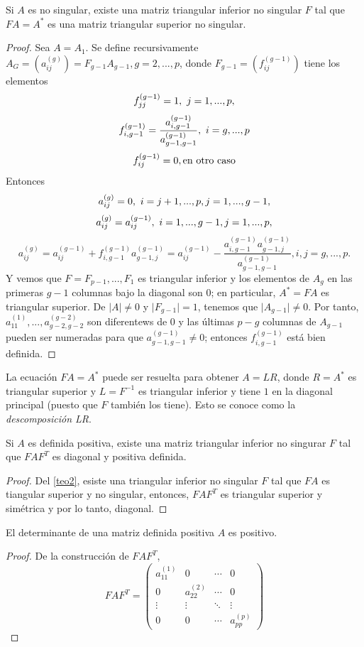 \begin{teorema}\label{teo2}
Si $A$ es no singular, existe una matriz triangular inferior no singular $F$ tal que $FA=A^*$ es una matriz triangular superior no singular.
\end{teorema}
\begin{proof}
Sea $A=A_1$. Se define recursivamente $A_G=(a_{ij}^{(g)})=F_{g-1}A_{g-1},g=2,...,p$, donde $F_{g-1}=(f_{ij}^{(g-1)})$ tiene los elementos
\[ f_{jj}^{(g-1)}=1,\textnormal{   } j=1,...,p, \]
\[ f_{i,g-1}^{(g-1)} = \frac{a_{i,g-1}^{(g-1)} }{a_{g-1,g-1}^{(g-1)}}, \textnormal{   } i=g,...,p \]
\[ f_{ij}^{(g-1)}=0, \textnormal{en otro caso} \]
Entonces
\[ a_{ij}^{(g)}=0, \textnormal{     } i=j+1,...,p, j=1,...,g-1, \]
\[ a_{ij}^{(g)}=a_{ij}^{(g-1)}, \textnormal{     } i=1,...,g-1, j=1,...,p, \]
\[ a_{ij}^{(g)}=a_{ij}^{(g-1)} + f_{i,g-1}^{(g-1)} a_{g-1,j}^{(g-1)}=a_{ij}^{(g-1)} - \frac{a_{i,g-1}^{(g-1)} a_{g-1,j}^{(g-1)}}{a_{g-1,g-1}^{(g-1)}}, i,j=g,...,p. \]
Y vemos que $F=F_{p-1},...,F_1$ es triangular inferior y los elementos de $A_g$ en las primeras $g-1$ columnas bajo la diagonal son $0$; en particular, $A^*=FA$ es triangular superior. De $\vert A \vert \neq 0$ y $\vert F_{g-1} \vert=1$, tenemos que $\vert A_{g-1} \vert \neq 0$. Por tanto, $a_{11}^{(1)},...,a_{g-2,g-2}^{(g-2)}$ son diferentews de $0$ y las últimas $p-g$ columnas de $A_{g-1}$ pueden ser numeradas para que $a_{g-1,g-1}^{(g-1)} \neq 0$; entonces $f_{i,g-1}^{(g-1)}$ está bien definida.
\end{proof}
La ecuación $FA=A^*$ puede ser resuelta para obtener $A=LR$, donde $R=A^*$ es triangular superior y $L=F^{-1}$ es triangular inferior y tiene $1$ en la diagonal principal (puesto que $F$ también los tiene). Esto se conoce como la \textit{descomposición LR}.
\begin{corolario}
Si $A$ es definida positiva, existe una matriz triangular inferior no singurar $F$ tal que $FAF^T$ es diagonal y positiva definida.
\end{corolario}
\begin{proof}
Del \autoref{teo2}, esiste una triangular inferior no singular $F$ tal que $FA$ es tiangular superior y no singular, entonces, $FAF^T$ es triangular superior y simétrica y por lo tanto, diagonal.
\end{proof}
\begin{corolario}
El determinante de una matriz definida positiva $A$ es positivo.
\end{corolario}
\begin{proof}
De la construcción de $FAF^T$,
\begin{equation}
FAF^T=\begin{pmatrix}
a_{11}^{(1)} & 0 & \cdots & 0\\
0 & a_{22}^{(2)} & \cdots & 0\\
\vdots & \vdots & \ddots & \vdots\\
0 & 0 & \cdots & a_{pp}^{(p)}
\end{pmatrix}
\end{equation} 
\end{proof}

